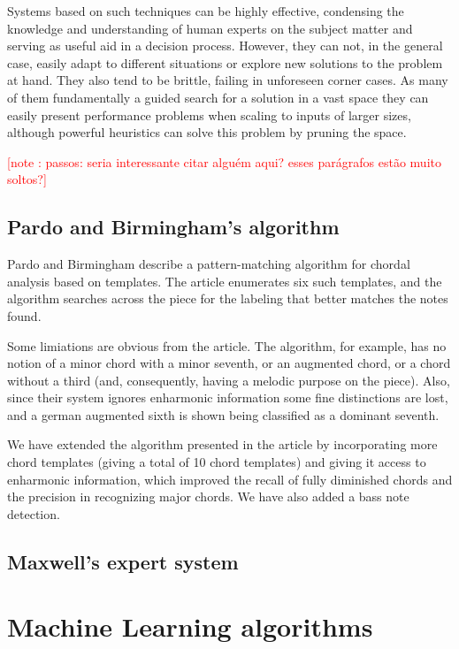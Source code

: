 \documentclass{article}
\newcounter{notecounter}
\newcommand{\note}[1]{
  \addtocounter{notecounter}{1}
  \textcolor{red}{[note \arabic{notecounter}: #1]}
}
\begin{document}
Systems based on such techniques can be highly effective, condensing
the knowledge and understanding of human experts on the subject matter
and serving as useful aid in a decision process.  However, they can
not, in the general case, easily adapt to different situations or
explore new solutions to the problem at hand.  They also tend to be
brittle, failing in unforeseen corner cases.  As many of them
fundamentally a guided search for a solution in a vast space they can
easily present performance problems when scaling to inputs of larger
sizes, although powerful heuristics can solve this problem by pruning
the space. \note{passos: seria interessante citar alguém aqui? esses
  parágrafos estão muito soltos?}

\subsection{Pardo and Birmingham's algorithm}
\label{sec:pardo}

Pardo and Birmingham \cite{pardo.ea:algorithms} describe a
pattern-matching algorithm for chordal analysis based on
templates. The article enumerates six such templates, and the
algorithm searches across the piece for the labeling that better
matches the notes found.

Some limiations are obvious from the article. The algorithm, for
example, has no notion of a minor chord with a minor seventh, or an
augmented chord, or a chord without a third (and, consequently, having
a melodic purpose on the piece). Also, since their system ignores
enharmonic information some fine distinctions are lost, and a german
augmented sixth is shown being classified as a dominant seventh.

We have extended the algorithm presented in the article by
incorporating more chord templates (giving a total of 10 chord
templates) and giving it access to enharmonic information, which
improved the recall of fully diminished chords and the precision in
recognizing major chords. We have also added a bass note detection.

\subsection{Maxwell's expert system}
\label{sec:maxwell}



\section{Machine Learning algorithms}
\label{sec:stat-algor}
\end{document}
